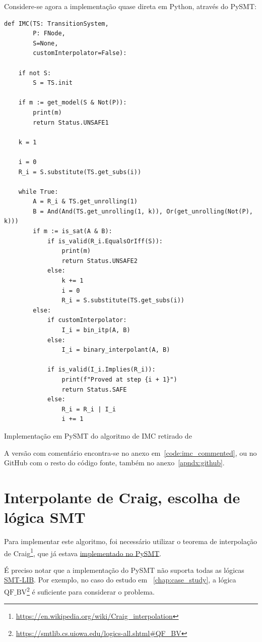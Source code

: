 \documentclass[11pt,a4paper]{report}%
\newenvironment{code}{\captionsetup{type=listing}}{}
\def\smtlib{\href{https://smtlib.cs.uiowa.edu/logics.shtml}{SMT-LIB}}
\begin{document}
Considere-se agora a implementação quase direta em Python, através do PySMT:


\begin{code}
\begin{verbatim}
def IMC(TS: TransitionSystem,
        P: FNode,
        S=None,
        customInterpolator=False):

    if not S:
        S = TS.init

    if m := get_model(S & Not(P)):
        print(m)
        return Status.UNSAFE1

    k = 1

    i = 0
    R_i = S.substitute(TS.get_subs(i))

    while True:
        A = R_i & TS.get_unrolling(1)
        B = And(And(TS.get_unrolling(1, k)), Or(get_unrolling(Not(P), k)))
        if m := is_sat(A & B):
            if is_valid(R_i.EqualsOrIff(S)):
                print(m)
                return Status.UNSAFE2
            else:
                k += 1
                i = 0
                R_i = S.substitute(TS.get_subs(i))
        else:
            if customInterpolator:
                I_i = bin_itp(A, B)
            else:
                I_i = binary_interpolant(A, B)

            if is_valid(I_i.Implies(R_i)):
                print(f"Proved at step {i + 1}")
                return Status.SAFE
            else:
                R_i = R_i | I_i
                i += 1
\end{verbatim}
\caption{Implementação em PySMT do algoritmo de IMC retirado de \cite{interpolation2}}
\label{code:imc}
\end{code}

A versão com comentário encontra-se no anexo em~\ref{code:imc_commented}, ou no GitHub com
o resto do código fonte, também no anexo~\ref{apndx:github}.

\section*{Interpolante de Craig, escolha de lógica SMT}

Para implementar este algoritmo, foi necessário utilizar o teorema de interpolação de
Craig\footnote{\url{https://en.wikipedia.org/wiki/Craig_interpolation}}, que já estava
\href{https://en.wikipedia.org/wiki/Craig_interpolation}{implementado no PySMT}.

É preciso notar que a implementação do PySMT não suporta todas as lógicas \smtlib.
Por exemplo, no caso do estudo em ~\ref{chap:case_study}, a lógica $\text{QF_BV}$\footnote{\url{https://smtlib.cs.uiowa.edu/logics-all.shtml#QF_BV}}
é suficiente para considerar o problema.
\end{document}

